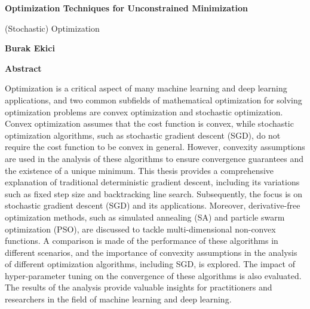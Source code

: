 \thispagestyle{plain}
\begin{center}
    \Large
    \textbf{Optimization Techniques for Unconstrained Minimization}

    \vspace{0.4cm}
    \large
    (Stochastic) Optimization

    \vspace{0.4cm}
    \textbf{Burak Ekici}

    \vspace{0.9cm}
    \textbf{Abstract}
\end{center}
Optimization is a critical aspect of many machine learning and deep learning applications, and two common subfields of mathematical optimization for solving optimization problems are convex optimization and stochastic optimization. Convex optimization assumes that the cost function is convex, while stochastic optimization algorithms, such as stochastic gradient descent (SGD), do not require the cost function to be convex in general. However, convexity assumptions are used in the analysis of these algorithms to ensure convergence guarantees and the existence of a unique minimum.
This thesis provides a comprehensive explanation of traditional deterministic gradient descent, including its variations such as fixed step size and backtracking line search. Subsequently, the focus is on stochastic gradient descent (SGD) and its applications. Moreover, derivative-free optimization methods, such as simulated annealing (SA) and particle swarm optimization (PSO), are discussed to tackle multi-dimensional non-convex functions. A comparison is made of the performance of these algorithms in different scenarios, and the importance of convexity assumptions in the analysis of different optimization algorithms, including SGD, is explored. The impact of hyper-parameter tuning on the convergence of these algorithms is also evaluated. The results of the analysis provide valuable insights for practitioners and researchers in the field of machine learning and deep learning.
